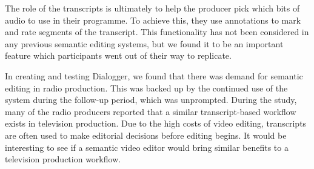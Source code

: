 The role of the transcripts is ultimately to help the producer pick which bits of audio to use in their programme. To
achieve this, they use annotations to mark and rate segments of the transcript. This functionality has not been
considered in any previous semantic editing systems, but we found it to be an important feature which participants went
out of their way to replicate.

In creating and testing Dialogger, we found that there was demand for semantic editing in radio production. This was
backed up by the continued use of the system during the follow-up period, which was unprompted.  During the study, many
of the radio producers reported that a similar transcript-based workflow exists in television production. Due to the
high costs of video editing, transcripts are often used to make editorial decisions before editing begins. It would be
interesting to see if a semantic video editor would bring similar benefits to a television production workflow.





















